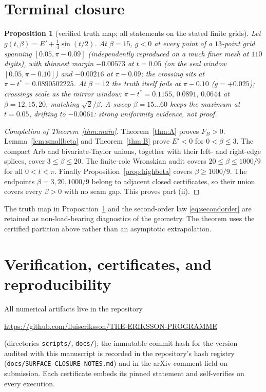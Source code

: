 \documentclass[11pt]{article}
\newtheorem{proposition}[theorem]{Proposition}
\theoremstyle{remark}
\newcommand{\FB}{F_{\!B}}
\begin{document}
\section{Terminal closure}\label{sec:closure}

\begin{proposition}[verified truth map; all statements on the stated
finite grids]\label{prop:truthmap}
Let $g(t,\beta)=E'+\tfrac14\sin(t/2)$. At $\beta=15$, $g<0$ at every
point of a $13$-point grid spanning $[0.05,\pi-0.09]$ (independently
reproduced on a much finer mesh at $110$ digits), with thinnest margin $-0.00573$ at $t=0.05$ (on the
seal window $[0.05,\pi-0.10]$) and $-0.00216$ at $\pi-0.09$; the
crossing sits at $\pi-t^*=0.0890502225$. At $\beta=12$ the truth itself
fails at $\pi-0.10$ ($g=+0.025$); crossings scale as the mirror window:
$\pi-t^*=0.1155,\,0.0891,\,0.0644$ at $\beta=12,15,20$, matching
$\sqrt2/\beta$. A sweep $\beta=15\ldots60$ keeps the maximum at $t=0.05$,
drifting to $-0.0061$: strong uniformity evidence, not proof.
\end{proposition}

\begin{proof}[Completion of Theorem~\ref{thm:main}]
Theorem~\ref{thm:A} proves $\FB>0$.  Lemma~\ref{lem:smallbeta} and
Theorem~\ref{thm:B} prove $E'<0$ for $0<\beta\le3$.  The compact Arb
and bivariate-Taylor unions, together with their left- and right-edge
splices, cover $3\le\beta\le20$.  The finite-role Wronskian audit covers
$20\le\beta\le1000/9$ for all $0<t<\pi$.  Finally
Proposition~\ref{prop:highbeta} covers
$\beta\ge1000/9$.  The endpoints $\beta=3,20,1000/9$ belong to adjacent
closed certificates, so their union covers every $\beta>0$ with no seam
gap.  This proves part \textup{(ii)}.
\end{proof}

The truth map in Proposition~\ref{prop:truthmap} and the second-order law
\eqref{eq:secondorder} are retained as non-load-bearing diagnostics of the
geometry.  The theorem uses the certified partition above rather than an
asymptotic extrapolation.

\section{Verification, certificates, and reproducibility}\label{sec:verif}

All numerical artifacts live in the repository
\begin{center}
\url{https://github.com/lluiseriksson/THE-ERIKSSON-PROGRAMME}
\end{center}
(directories \texttt{scripts/}, \texttt{docs/}); the immutable commit
hash for the version audited with this manuscript is recorded in the
repository's hash registry (\texttt{docs/SURFACE-CLOSURE-NOTES.md}) and
in the arXiv comment field on submission. Each certificate embeds its
pinned statement and self-verifies on every execution.
\end{document}
